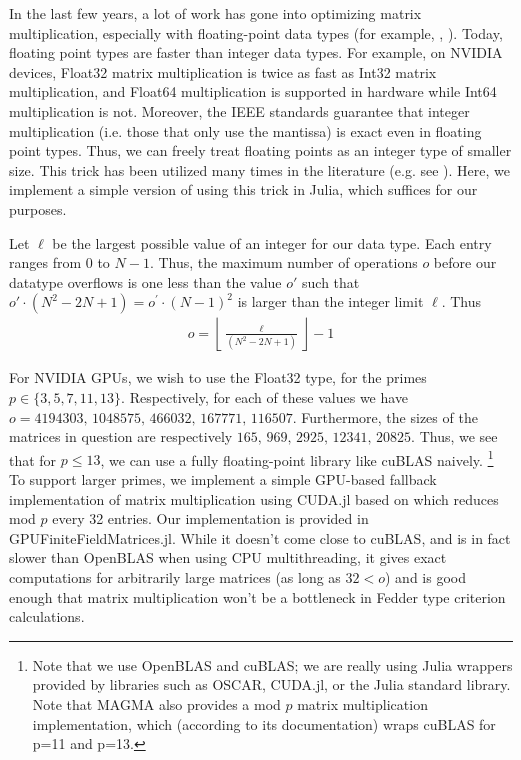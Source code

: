 In the last few years, a lot of work has gone into optimizing matrix multiplication,
especially with floating-point data types
(for example, \cite{nvidia-2024-cublas}, \cite{openblas-2024-openblas}).
Today, floating point types are faster than
integer data types.
For example, on NVIDIA devices, Float32 matrix multiplication
is twice as fast as Int32 matrix multiplication, and Float64
multiplication is supported in hardware while Int64 multiplication
is not.
Moreover, the IEEE standards guarantee that integer multiplication (i.e. those that only use the mantissa) 
is exact even in floating point types. 
Thus, we can freely treat floating points as an integer type of smaller size.
This trick has been utilized many times in the literature (e.g. see \cite{bglm-2024-matmul-modp}).
Here, we implement a simple version of using this trick in Julia,
which suffices for our purposes.

Let \(\ell\) be the largest possible value of an integer for our data type.
Each entry ranges from \(0\) to \(N-1\).
Thus, the maximum number of operations $o$ before our datatype overflows is one less than the value $o'$ such that 
$o' \cdot (N^2 - 2N + 1) = o^{\prime} \cdot (N-1)^{2} $ is larger than the integer limit $\ell$. Thus
\begin{align*}
    o = \left\lfloor \frac{\ell}{(N^2 - 2N + 1)} \right\rfloor - 1
\end{align*}

For NVIDIA GPUs, we wish to use the Float32 type, for the primes
\(p \in \{3,5,7,11,13\}\).
Respectively, for each of these values we have
\(o = 4194303, \,1048575, \,466032, \,167771, \,116507\).
Furthermore, the sizes of the matrices in question are
respectively
 \(165, \,969, \,2925, \,12341, \,20825\).
Thus, we see that for \(p \leq 13\), we can use a fully floating-point
library like cuBLAS naively.
\footnote{
    Note that we use OpenBLAS and cuBLAS;
    we are really using Julia wrappers
    provided by libraries such as OSCAR,
    CUDA.jl, or the Julia standard library.
    Note that MAGMA also provides
    a mod $p$ matrix multiplication implementation,
    which (according to its documentation) wraps cuBLAS for
    p=11 and p=13.
}
To support larger primes, we implement a
simple GPU-based fallback implementation of matrix multiplication using CUDA.jl
based on \cite{mao-2024-matmul}
which reduces mod \(p\) every 32 entries.
Our implementation is provided in GPUFiniteFieldMatrices.jl.
While it doesn't come close to cuBLAS, and is in fact slower
than OpenBLAS when using CPU multithreading, it gives exact
computations for arbitrarily large
matrices (as long as \(32 < o\))
and is good enough that
matrix multiplication won't be a bottleneck in
Fedder type criterion calculations.

